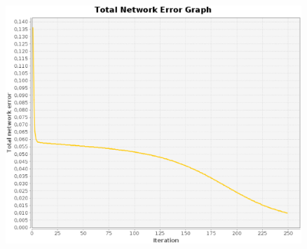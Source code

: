 \documentclass[twoside,openright,a4paper,11pt,french]{article}
\begin{document}
\includegraphics[width=12cm,height=9cm]{./pics/fct/carre_10_norm_std.eps}





\end{document}
